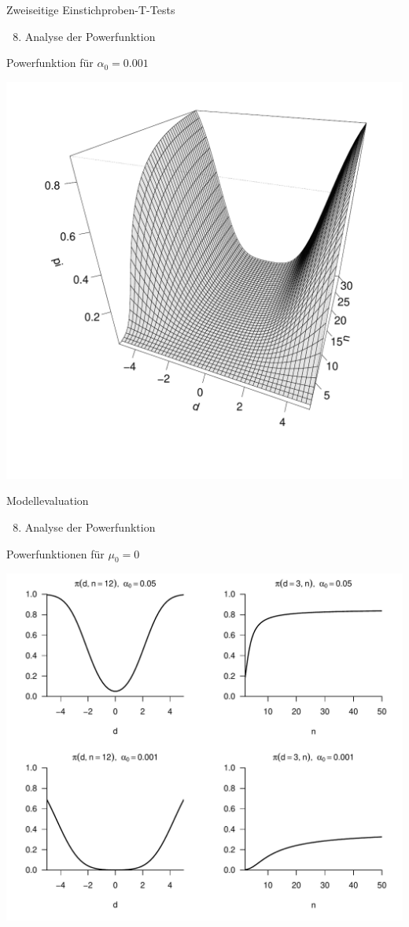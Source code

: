 \documentclass[
  8pt,
  ignorenonframetext,
]{beamer}
\providecommand{\tightlist}{%
  \setlength{\itemsep}{0pt}\setlength{\parskip}{0pt}}
\begin{document}
\begin{frame}{Zweiseitige Einstichproben-T-Tests}
\protect\hypertarget{zweiseitige-einstichproben-t-tests}{}
\begin{enumerate}
[(1)]
\setcounter{enumi}{7}
\tightlist
\item
  Analyse der Powerfunktion
\end{enumerate}

\small

Powerfunktion für \(\alpha_0 = 0.001\)

\begin{center}\includegraphics[width=0.6\linewidth]{9_Abbildungen/alm_9_t_test_ungerichtet_power_0001} \end{center}
\end{frame}

\begin{frame}{Modellevaluation}
\protect\hypertarget{modellevaluation-21}{}
\begin{enumerate}
[(1)]
\setcounter{enumi}{7}
\tightlist
\item
  Analyse der Powerfunktion
\end{enumerate}

\small
\justifying

Powerfunktionen für \(\mu_0 = 0\) \vspace{2mm}

\begin{center}\includegraphics[width=0.65\linewidth]{9_Abbildungen/alm_9_t_test_ungerichtet_powerfunktionen} \end{center}
\end{frame}
\end{document}
